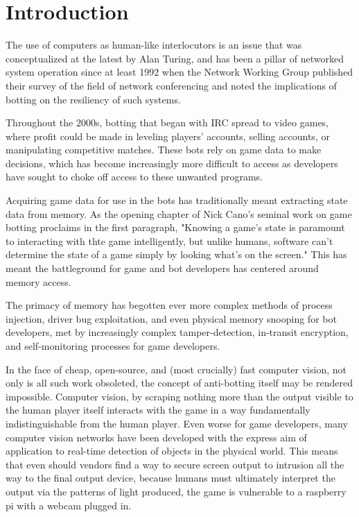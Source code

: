 \documentclass[sigconf]{acmart}
\begin{document}
\maketitle

\section{Introduction}
The use of computers as human-like interlocutors is an issue that was conceptualized at the latest by Alan Turing, and has been a pillar of networked system operation since at least 1992 when the Network Working Group published their survey of the field of network conferencing and noted the implications of botting on the resiliency of such systems. \cite{NWG01}

Throughout the 2000s, botting that began with IRC spread to video games, where profit could be made in leveling players' accounts, selling accounts, or manipulating competitive matches. These bots rely on game data to make decisions, which has become increasingly more difficult to access as developers have sought to choke off access to these unwanted programs. \cite{Cano01}

Acquiring game data for use in the bots has traditionally meant extracting state data from memory. As the opening chapter of Nick Cano's seminal work on game botting proclaims in the first paragraph, "Knowing a game's state is paramount to interacting with thte game intelligently, but unlike humans, software can't determine the state of a game simply by looking what's on the screen." \cite{Cano01} This has meant the battleground for game and bot developers has centered around memory access.

The primacy of memory has begotten ever more complex methods of process injection, driver bug exploitation, and even physical memory snooping for bot developers, met by increasingly complex tamper-detection, in-transit encryption, and self-monitoring processes for game developers.\cite{Cano01}

In the face of cheap, open-source, and (most crucially) fast computer vision, not only is all such work obsoleted, the concept of anti-botting itself may be rendered impossible. Computer vision, by scraping nothing more than the output visible to the human player itself interacts with the game in a way fundamentally indistinguishable from the human player. Even worse for game developers, many computer vision networks have been developed with the express aim of application to real-time detection of objects in the physical world. \cite{YOLO} This means that even should vendors find a way to secure screen output to intrusion all the way to the final output device, because humans must ultimately interpret the output via the patterns of light produced, the game is vulnerable to a raspberry pi with a webcam plugged in.
\end{document}
